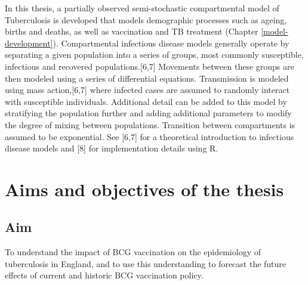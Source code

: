 \documentclass[11pt,twoside]{bristolthesis}
\begin{document}
  In this thesis, a partially observed semi-stochastic compartmental model of Tuberculosis is developed that models demographic processes such as ageing, births and deaths, as well as vaccination and TB treatment (Chapter \ref{model-development}). Compartmental infectious disease models generally operate by separating a given population into a series of groups, most commonly susceptible, infectious and recovered populations.{[}6,7{]} Movements between these groups are then modeled using a series of differential equations. Transmission is modeled using mass action,{[}6,7{]} where infected cases are assumed to randomly interact with susceptible individuals. Additional detail can be added to this model by stratifying the population further and adding additional parameters to modify the degree of mixing between populations. Transition between compartments is assumed to be exponential. See {[}6,7{]} for a theoretical introduction to infectious disease models and {[}8{]} for implementation details using R.
  
  \hypertarget{aims-and-objectives-of-the-thesis}{%
  \section{Aims and objectives of the thesis}\label{aims-and-objectives-of-the-thesis}}
  
  \hypertarget{aim}{%
  \subsection{Aim}\label{aim}}
  
  To understand the impact of BCG vaccination on the epidemiology of tuberculosis in England, and to use this understanding to forecast the future effects of current and historic BCG vaccination policy.
  
\end{document}
